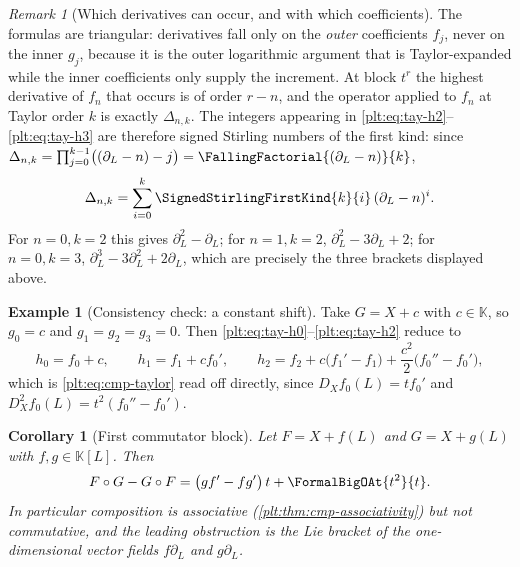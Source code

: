 \documentclass[11pt,oneside]{article}
\theoremstyle{plain}
\newtheorem{corollary}[theorem]{Corollary}
\theoremstyle{definition}
\newtheorem{example}[theorem]{Example}
\theoremstyle{remark}
\newtheorem{remark}[theorem]{Remark}
\newcommand{\K}{\mathbb{K}}
\newcommand{\DX}{D_{X}}                                  %
\newcommand{\shiftop}[2]{\Delta_{#1,#2}}                 %
\newcommand{\compose}{\mathbin{\circ}}
\newcommand{\stirlingsigned}[2]{\SignedStirlingFirstKind{#1}{#2}}
\begin{document}
\begin{remark}[Which derivatives can occur, and with which coefficients]
The formulas are triangular: derivatives fall only on the \emph{outer}
coefficients \(f_{j}\), never on the inner \(g_{j}\), because it is the outer
logarithmic argument that is Taylor-expanded while the inner coefficients only
supply the increment.  At block \(t^{r}\) the highest derivative of \(f_{n}\)
that occurs is of order \(r-n\), and the operator applied to \(f_{n}\) at
Taylor order \(k\) is exactly \(\shiftop{n}{k}\).  The integers appearing in
\eqref{plt:eq:tay-h2}--\eqref{plt:eq:tay-h3} are therefore signed Stirling
numbers of the first kind: since
\(\shiftop{n}{k}=\prod_{j=0}^{k-1}\bigl((\partial_L-n)-j\bigr)
 =\FallingFactorial{(\partial_L-n)}{k}\),
\begin{equation}\label{plt:eq:tay-shiftop-stirling}
 \shiftop{n}{k}
 =\sum_{i=0}^{k}\stirlingsigned{k}{i}\,(\partial_L-n)^{i}.
\end{equation}
For \(n=0,k=2\) this gives \(\partial_L^{2}-\partial_L\); for \(n=1,k=2\),
\(\partial_L^{2}-3\partial_L+2\); for \(n=0,k=3\),
\(\partial_L^{3}-3\partial_L^{2}+2\partial_L\), which are precisely the three
brackets displayed above.
\end{remark}

\begin{example}[Consistency check: a constant shift]\label{plt:ex:tay-shift}
Take \(G=X+c\) with \(c\in\K\), so \(g_{0}=c\) and \(g_{1}=g_{2}=g_{3}=0\).
Then \eqref{plt:eq:tay-h0}--\eqref{plt:eq:tay-h2} reduce to
\[
 h_{0}=f_{0}+c,\qquad
 h_{1}=f_{1}+cf_{0}',\qquad
 h_{2}=f_{2}+c\bigl(f_{1}'-f_{1}\bigr)+\frac{c^{2}}{2}\bigl(f_{0}''-f_{0}'\bigr),
\]
which is \eqref{plt:eq:cmp-taylor} read off directly, since
\(\DX f_{0}(L)=tf_{0}'\) and \(\DX^{2}f_{0}(L)=t^{2}(f_{0}''-f_{0}')\).
\end{example}

\begin{corollary}[First commutator block]\label{plt:cor:tay-commutator}
Let \(F=X+f(L)\) and \(G=X+g(L)\) with \(f,g\in\K[L]\).  Then
\begin{equation}\label{plt:eq:tay-commutator}
 F\compose G-G\compose F
 =\bigl(gf'-fg'\bigr)\,t+\FormalBigOAt{t^{2}}{t}.
\end{equation}
In particular composition is associative
(\cref{plt:thm:cmp-associativity}) but not commutative, and the leading
obstruction is the Lie bracket of the one-dimensional vector fields
\(f\partial_L\) and \(g\partial_L\).
\end{corollary}
\end{document}
